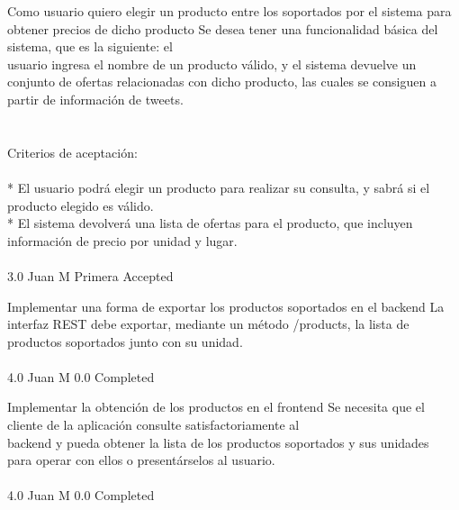 \vspace{20pt}

	{Como usuario quiero elegir un producto entre los soportados por el sistema para obtener precios de dicho producto} %
	{Se desea tener una funcionalidad básica del sistema, que es la siguiente: el\\
usuario ingresa el nombre de un producto válido, y el sistema devuelve un\\
conjunto de ofertas relacionadas con dicho producto, las cuales se consiguen a\\
partir de información de tweets.\\
\\
  \\
Criterios de aceptación:\\
\\
* El usuario podrá elegir un producto para realizar su consulta, y sabrá si el producto elegido es válido.  \\
* El sistema devolverá una lista de ofertas para el producto, que incluyen información de precio por unidad y lugar.\\
\\
} %
	{} %
	{3.0} %
	{Juan M} %
	{Primera} %
	{Accepted} %

		{Implementar una forma de exportar los productos soportados en el backend} %
		{La interfaz REST debe exportar, mediante un método /products, la lista de\\
productos soportados junto con su unidad.\\
\\
} %
		{4.0} %
		{Juan M} %
		{0.0} %
		{Completed} %

		{Implementar la obtención de los productos en el frontend} %
		{Se necesita que el cliente de la aplicación consulte satisfactoriamente al\\
backend y pueda obtener la lista de los productos soportados y sus unidades\\
para operar con ellos o presentárselos al usuario.\\
\\
} %
		{4.0} %
		{Juan M} %
		{0.0} %
		{Completed} %

